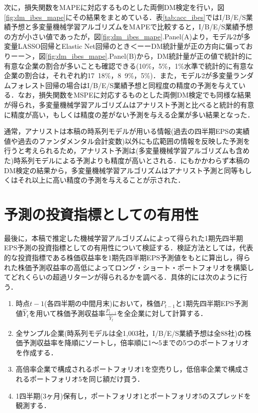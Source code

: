 \documentclass[a4paper，12pt]{jsarticle}
\begin{document}
次に，損失関数をMAPEに対応するものとした両側DM検定を行い，図\ref{fig:dm_ibes_mape}にその結果をまとめている．表\ref{tab:acc_ibes}ではI/B/E/S業績予想と多変量機械学習アルゴリズムをMAPEで比較すると，I/B/E/S業績予想の方が小さい値であったが，図\ref{fig:dm_ibes_mape}.Panel(A)より，モデル2が多変量LASSO回帰とElastic Net回帰のとき＜ーーDM統計量が正の方向に偏っておりーー＞，図\ref{fig:dm_ibes_mape}.Panel(B)から，DM統計量が正の値で統計的に有意な企業の割合が多いことも確認できる(10\%，5\%，1\%水準で統計的に有意な企業の割合は，それぞれ約17~18\%，8~9\%，5\%)．また，モデル2が多変量ランダムフォレスト回帰の場合はI/B/E/S業績予想と同程度の精度の予測を与えている．なお，損失関数をMSPEに対応するものとした両側DM検定でも同様な結果が得られ，多変量機械学習アルゴリズムはアナリスト予測と比べると統計的有意に精度が高い，もしくは精度の差がない予測を与える企業が多い結果となった．

通常，アナリストは本稿の時系列モデルが用いる情報(過去の四半期EPSの実績値や過去のファンダメンタル会計変数)以外にも広範囲の情報を反映した予測を行うと考えられるため\citep{sakurai1990}，アナリスト予測は(多変量機械学習アルゴリズムも含めた)時系列モデルによる予測よりも精度が高いとされる．にもかかわらず本稿のDM検定の結果から，多変量機械学習アルゴリズムはアナリスト予測と同等もしくはそれ以上に高い精度の予測を与えることが示された．

\part{予測の投資指標としての有用性} \label{par:portfolio}

最後に，本稿で推定した機械学習アルゴリズムによって得られた1期先四半期EPS予測の投資指標としての有用性について検証する．検証方法としては，代表的な投資指標である株価収益率を1期先四半期EPS予測値をもとに算出し，得られた株価予測収益率の高低によってロング・ショート・ポートフォリオを構築してどれくらいの超過リターンが得られるかを調べる．具体的には次のように行う．

\begin{enumerate}
  \item 時点$t-1$(各四半期の中間月末)において，株価$P_{t-1}$と1期先四半期EPS予測値$\hat{Y}_t$を用いて株価予測収益率$\frac{P_{t-1}}{\hat{Y}_t}$を全企業に対して計算する．
  \item 全サンプル企業(時系列モデルは全1,003社，I/B/E/S業績予想は全88社)の株価予測収益率を降順にソートし，倍率順に1～5までの5つのポートフォリオを作成する．
  \item 高倍率企業で構成されるポートフォリオ1を空売りし，低倍率企業で構成されるポートフォリオ5を同じ額だけ買う．
  \item 1四半期(3ヶ月)保有し，ポートフォリオ1とポートフォリオ5のスプレッドを観測する．
\end{enumerate}
\end{document}

